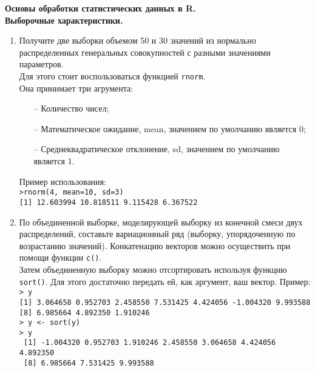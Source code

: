 \textbf{Основы обработки статистических данных в R. \\ \indent Выборочные характеристики.}
\begin{enumerate}
	\item Получите две выборки объемом 50 и 30 значений из нормально распределенных генеральных совокупностей с разными значениями параметров.\\
		Для этого стоит воспользоваться функцией \texttt{rnorm}.\\
		Она принимает три агрумента:
		\begin{itemize}
			\item[--] Количество чисел;
			\item[--] Математическое ожидание, mean, значением по умолчанию является 0; 
			\item[--] Среднеквадратическое отклонение, sd, значением по умолчанию является 1.
		\end{itemize} 
		Пример использования:\\
		\indent \texttt{>rnorm(4, mean=10, sd=3)}\\
		\indent \texttt{[1] 12.603994 10.818511  9.115428  6.367522}

	\item По объединенной выборке, моделирующей выборку из конечной смеси двух распределений, 
		составьте вариационный ряд (выборку, упорядоченную по возрастанию значений).
		Конкатенацию векторов можно осуществить при помощи функции \texttt{c()}.\\
		Затем объединенную выборку можно отсортировать используя функцию \texttt{sort()}. 
		Для этого достаточно передать ей, как аргумент, ваш вектор. Пример:\\
		\indent \texttt{> y} \\
 		\indent \texttt{[1]  3.064658  0.952703  2.458550  7.531425  4.424056 -1.004320  9.993588} \\
 		\indent \texttt{[8]  6.985664  4.892350  1.910246} \\
        \indent \texttt{> y <- sort(y)} \\
		\indent \texttt{> y} \\
		\indent \texttt{ [1] -1.004320  0.952703  1.910246  2.458550  3.064658  4.424056  4.892350} \\
		\indent \texttt{ [8]  6.985664  7.531425  9.993588}


\end{enumerate}
